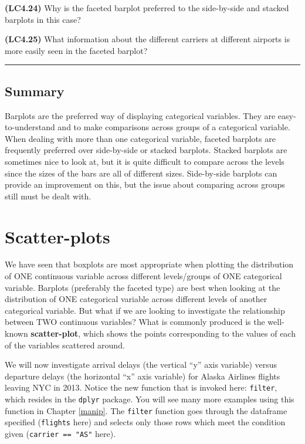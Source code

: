 \documentclass[]{tufte-book}
\let\oldrule=\rule
\renewcommand{\rule}[1]{\oldrule{\linewidth}}
\begin{document}
\textbf{(LC4.24)} Why is the faceted barplot preferred to the
side-by-side and stacked barplots in this case?

\textbf{(LC4.25)} What information about the different carriers at
different airports is more easily seen in the faceted barplot?

\begin{center}\rule{0.5\linewidth}{\linethickness}\end{center}

\subsection{Summary}\label{summary-2}

Barplots are the preferred way of displaying categorical variables. They
are easy-to-understand and to make comparisons across groups of a
categorical variable. When dealing with more than one categorical
variable, faceted barplots are frequently preferred over side-by-side or
stacked barplots. Stacked barplots are sometimes nice to look at, but it
is quite difficult to compare across the levels since the sizes of the
bars are all of different sizes. Side-by-side barplots can provide an
improvement on this, but the issue about comparing across groups still
must be dealt with.

\section{Scatter-plots}\label{scatter-plots}

We have seen that boxplots are most appropriate when plotting the
distribution of ONE continuous variable across different levels/groups
of ONE categorical variable. Barplots (preferably the faceted type) are
best when looking at the distribution of ONE categorical variable across
different levels of another categorical variable. But what if we are
looking to investigate the relationship between TWO continuous
variables? What is commonly produced is the well-known
\textbf{scatter-plot}, which shows the points corresponding to the
values of each of the variables scattered around.

We will now investigate arrival delays (the vertical ``y'' axis
variable) versus departure delays (the horizontal ``x'' axis variable)
for Alaska Airlines flights leaving NYC in 2013. Notice the new function
that is invoked here: \texttt{filter}, which resides in the
\texttt{dplyr} package. You will see many more examples using this
function in Chapter \ref{manip}. The \texttt{filter} function goes
through the dataframe specified (\texttt{flights} here) and selects only
those rows which meet the condition given (\texttt{carrier\ ==\ "AS"}
here).
\end{document}
